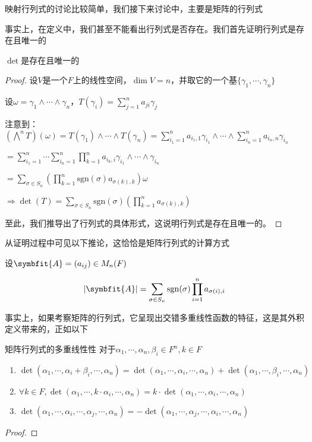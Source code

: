 \documentclass[12pt, a4paper, oneside, UTF8]{ctexbook}
\begin{document}
			映射行列式的讨论比较简单，我们接下来讨论中，主要是矩阵的行列式
			\begin{para}{0}

					事实上，在定义中，我们甚至不能看出行列式是否存在。我们首先证明行列式是存在且唯一的
					\begin{proposition}
						$\det$是存在且唯一的
					\end{proposition}
					\begin{proof}
						设$V$是一个$F$上的线性空间，$\dim V = n$，并取它的一个基$\{\gamma_1,\cdots,\gamma_n\}$

						设$\omega =\gamma _1 \wedge \cdots \wedge \gamma _n$，$T(\gamma_i) = \sum\limits_{j=1}^{n} a_{ji}\gamma_j$

						注意到：$\left(\bigwedge^n T\right)(\omega )=T(\gamma _1)\wedge\cdots\wedge T(\gamma _n)=\sum\limits_{i_1=1}^{n} a_{i_1,1} \gamma_{i_1}\wedge \cdots \wedge \sum\limits_{i_n=1}^{n} a_{i_n,n} \gamma_{i_n}$

						$=\sum\limits_{i_1=1}^{n}\cdots \sum\limits_{i_n=1}^{n} \prod\limits_{k=1}^{n}a_{i_k,i} \gamma _{i_1}\wedge\cdots\wedge\gamma _{i_n}$

						$=\sum\limits_{\sigma \in S_n} \left(\prod\limits_{k=1}^{n}\text{sgn}(\sigma )a_{\sigma(k),k} \right)\omega $

						$\Rightarrow \det(T)=\sum\limits_{\sigma \in S_n} \text{sgn}(\sigma )\left(\prod\limits_{k=1}^{n}a_{\sigma(k),k} \right)$

						至此，我们推导出了行列式的具体形式，这说明行列式是存在且唯一的。
					\end{proof}
					从证明过程中可见以下推论，这恰恰是矩阵行列式的计算方式
					\begin{corollary}{}
						设$\symbfit{A}=(a_{ij})\in M_n(F)$
						
						\begin{equation}
							|\symbfit{A}|=\sum_{\sigma \in S_n} \text{sgn}(\sigma) \prod_{i=1}^n a_{\sigma(i),i}
						\end{equation}
					\end{corollary}
					事实上，如果考察矩阵的行列式，它呈现出交错多重线性函数的特征，这是其外积定义带来的，正如以下
					\begin{them}{矩阵行列式的多重线性性}{}
						对于$\alpha_1,\cdots,\alpha_n,\beta_i \in F^n,k \in F$

						\begin{enumerate}
							\item $\det(\alpha_1,\cdots,\alpha_i + \beta_i,\cdots,\alpha_n)=\det(\alpha_1,\cdots,\alpha_i,\cdots,\alpha_n)+\det(\alpha_1,\cdots,\beta_i,\cdots,\alpha_n)$
							\item $\forall k\in F,\det(\alpha_1,\cdots,k\cdot \alpha_i,\cdots,\alpha_n)=k \cdot \det(\alpha_1,\cdots,\alpha_i,\cdots,\alpha_n)$
							\item $\det(\alpha_1,\cdots,\alpha_i,\cdots,\alpha_j,\cdots,\alpha_n)=-\det(\alpha_1,\cdots,\alpha_j,\cdots,\alpha_i,\cdots,\alpha_n)$
						\end{enumerate}
					\end{them}
					\begin{proof}
						

\end{proof}
\end{para}
\end{document}
